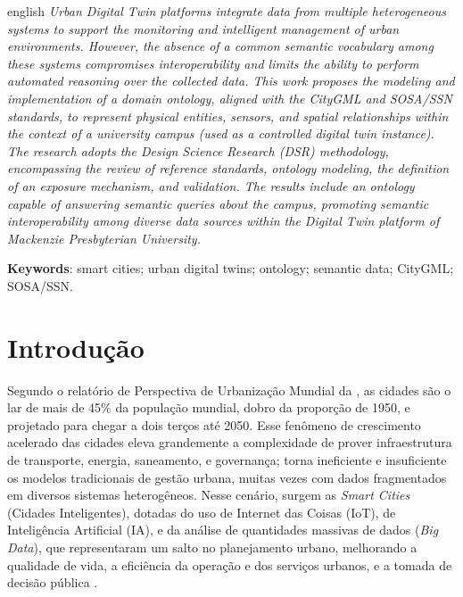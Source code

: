 \documentclass[
  article,   %
  11pt,      %
  oneside,   %
  a4paper,   %
  english,   %
  brazil,    %
  sumario=tradicional
]{abntex2}
\newcommand{\en}[1]{\foreignlanguage{english}{\textit{#1}}}
\begin{document}
\renewcommand{\resumoname}{Abstract}
\begin{resumoumacoluna}
  \begin{otherlanguage*}{english}
    \textit{Urban Digital Twin platforms integrate data from multiple heterogeneous systems to support the monitoring and intelligent management of urban environments.
      However, the absence of a common semantic vocabulary among these systems compromises
      interoperability and limits the ability to perform automated reasoning over the collected data.
      This work proposes the modeling and implementation of a domain ontology, aligned with the CityGML
      and SOSA/SSN standards, to represent physical entities, sensors, and spatial relationships within
      the context of a university campus (used as a controlled digital twin instance).
      The research adopts the Design Science Research (DSR) methodology, encompassing the review of
      reference standards, ontology modeling, the definition of an exposure mechanism, and validation.
      The results include an ontology capable of answering semantic queries about the
      campus, promoting semantic interoperability among diverse data sources within the Digital Twin platform of
      Mackenzie Presbyterian University.
    }

    \vspace{\onelineskip}

    \noindent
    \textbf{Keywords}: smart cities; urban digital twins; ontology; semantic data; CityGML; SOSA/SSN.
  \end{otherlanguage*}
\end{resumoumacoluna}


\textual

\section{Introdução}

Segundo o relatório de Perspectiva de Urbanização Mundial da , as cidades
são o lar de mais de 45\% da população mundial, dobro da proporção de 1950, e projetado para chegar
a dois terços até 2050.
Esse fenômeno de crescimento acelerado das cidades eleva grandemente a complexidade de prover
infraestrutura de transporte, energia, saneamento, e governança; torna ineficiente e insuficiente
os modelos tradicionais de gestão urbana, muitas vezes com dados fragmentados em diversos sistemas
heterogêneos.
Nesse cenário, surgem as \en{Smart Cities} (Cidades Inteligentes), dotadas do uso de Internet das
Coisas (IoT), de Inteligência Artificial (IA), e da análise de quantidades massivas de dados
(\en{Big Data}), que representaram um salto no planejamento urbano, melhorando a qualidade de vida,
a eficiência da operação e dos serviços urbanos, e a tomada de decisão pública
\cite{WEIL2023104862}.
\end{document}
